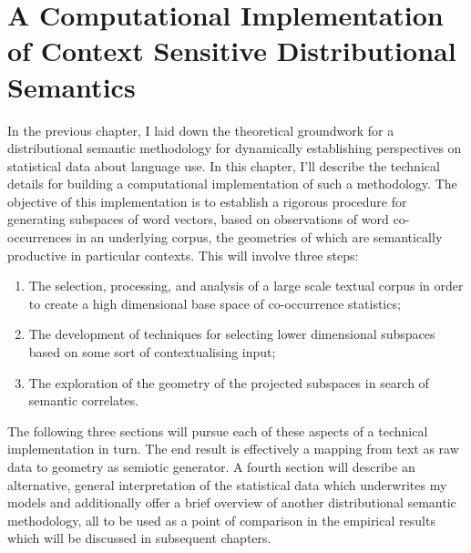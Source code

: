 \chapter{A Computational Implementation of Context Sensitive Distributional Semantics} \label{chap:method}
In the previous chapter, I laid down the theoretical groundwork for a distributional semantic methodology for dynamically establishing perspectives on statistical data about language use.  In this chapter, I'll describe the technical details for building a computational implementation of such a methodology.  The objective of this implementation is to establish a rigorous procedure for generating subspaces of word vectors, based on observations of word co-occurrences in an underlying corpus, the geometries of which are semantically productive in particular contexts.  This will involve three steps:

\begin{enumerate}
\item The selection, processing, and analysis of a large scale textual corpus in order to create a high dimensional base space of co-occurrence statistics;
\item The development of techniques for selecting lower dimensional subspaces based on some sort of contextualising input;
\item The exploration of the geometry of the projected subspaces in search of semantic correlates.
\end{enumerate}

The following three sections will pursue each of these aspects of a technical implementation in turn.  The end result is effectively a mapping from text as raw data to geometry as semiotic generator.  A fourth section will describe an alternative, general interpretation of the statistical data which underwrites my models and additionally offer a brief overview of another distributional semantic methodology, all to be used as a point of comparison in the empirical results which will be discussed in subsequent chapters.

